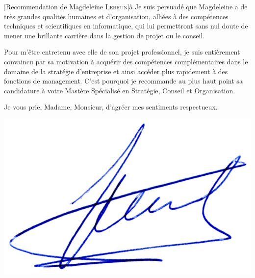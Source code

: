 \documentclass[a4paper,10pt]{article}
\begin{document}
\begin{letter}[Recommendation de Magdeleine \textsc{Lebrun}]{à}
Je  suis  persuadé que  Magdeleine  a  de  très  grandes qualités  humaines  et
d'organisation,  alliées  à  des  compétences  techniques  et  scientifiques  en
informatique, qui lui permettront sans nul doute de mener une brillante carrière
dans la gestion de projet ou le conseil.

Pour m'être entretenu avec elle de son projet professionnel, je suis entièrement
convaincu par sa  motivation à acquérir des compétences  complémentaires dans le
domaine de  la stratégie  d'entreprise et  ainsi accéder  plus rapidement  à des
fonctions de  management. C'est  pourquoi je  recommande au  plus haut  point sa
candidature à votre Mastère Spécialisé en Stratégie, Conseil et Organisation.


Je vous prie, Madame, Monsieur, d'agréer mes sentiments respectueux.

\end{letter}
\begin{flushright}
\includegraphics[width=.2\textwidth]{signgenaud.jpg}
\end{flushright}
\end{document}
